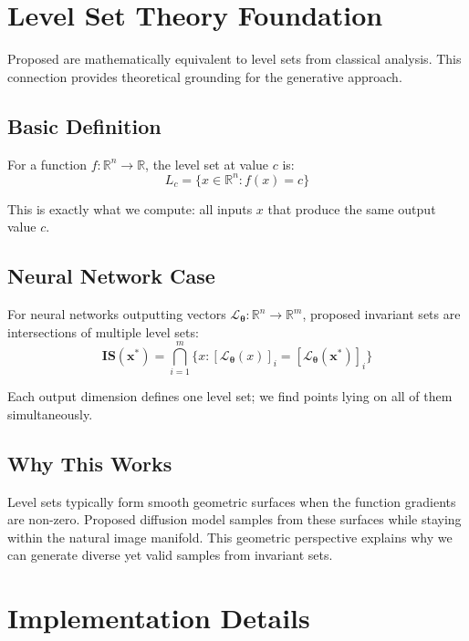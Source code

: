 \section{Level Set Theory Foundation}\label{appendix:level_sets}

Proposed \framework{} are mathematically equivalent to level sets from classical analysis. This connection provides theoretical grounding for the generative approach.

\subsection{Basic Definition}

For a function $f: \mathbb{R}^n \rightarrow \mathbb{R}$, the level set at value $c$ is:
\begin{equation}
L_c = \{x \in \mathbb{R}^n : f(x) = c\}
\end{equation}

This is exactly what we compute: all inputs $x$ that produce the same output value $c$.

\subsection{Neural Network Case}

For neural networks outputting vectors $\mathcal{L}_{\boldsymbol{\theta}}: \mathbb{R}^n \rightarrow \mathbb{R}^m$, proposed invariant sets are intersections of multiple level sets:
\begin{equation}
\mathbf{IS}(\mathbf{x^*}) = \bigcap_{i=1}^m \{x : [\mathcal{L}_{\boldsymbol{\theta}}(x)]_i = [\mathcal{L}_{\boldsymbol{\theta}}(\mathbf{x^*})]_i\}
\end{equation}

Each output dimension defines one level set; we find points lying on all of them simultaneously.

\subsection{Why This Works}

Level sets typically form smooth geometric surfaces when the function gradients are non-zero. Proposed diffusion model samples from these surfaces while staying within the natural image manifold. This geometric perspective explains why we can generate diverse yet valid samples from invariant sets.

\section{Implementation Details}\label{appendix:implementation}

